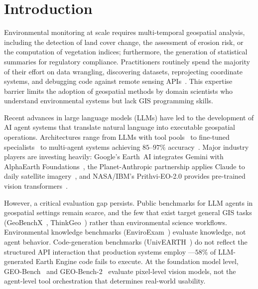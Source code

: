 \documentclass[sigconf]{acmart}
\begin{document}

\maketitle



\section{Introduction}
\label{sec:intro}

Environmental monitoring at scale requires multi-temporal geospatial analysis, including the detection of land cover change, the assessment of erosion risk, or the computation of vegetation indices; furthermore, the generation of statistical summaries for regulatory compliance. Practitioners routinely spend the majority of their effort on data wrangling, discovering datasets, reprojecting coordinate systems, and debugging code against remote sensing APIs~\cite{zhang2023geogpt, li2023llmgeo}. This expertise barrier limits the adoption of geospatial methods by domain scientists who understand environmental systems but lack GIS programming skills.

Recent advances in large language models (LLMs) have led to the development of AI agent systems that translate natural language into executable geospatial operations. Architectures range from LLMs with tool pools~\citep{zhang2023geogpt, akinboyewa2024giscopilot} to fine-tuned specialists~\citep{zhang2024gtchain, zhang2025envgpt} to multi-agent systems achieving $85$--$97\%$ accuracy~\citep{luo2025geojsonagents, lee2025geollmsquad}. Major industry players are investing heavily: Google's Earth~AI integrates Gemini with AlphaEarth Foundations~\citep{google2025earthai}, the Planet-Anthropic partnership applies Claude to daily satellite imagery~\citep{planet2025anthropic}, and NASA/IBM's Prithvi-EO-2.0 provides pre-trained vision transformers~\citep{szwarcman2024prithvi}.

However, a critical evaluation gap persists. Public benchmarks for LLM agents in geospatial settings remain scarce, and the few that exist target general GIS tasks (GeoBenchX~\citep{krechetova2025geobenchx}, ThinkGeo~\citep{shabbir2025thinkgeo}) rather than environmental science workflows. Environmental knowledge benchmarks (EnviroExam~\citep{huang2024enviroexam}) evaluate knowledge, not agent behavior. Code-generation benchmarks (UnivEARTH~\citep{kao2025univearth}) do not reflect the structured API interaction that production systems employ ---$58\%$ of LLM-generated Earth Engine code fails to execute. At the foundation model level, GEO-Bench~\citep{lacoste2023geobench} and GEO-Bench-2~\citep{simumba2025geobench2} evaluate pixel-level vision models, not the agent-level tool orchestration that determines real-world usability.
\end{document}
